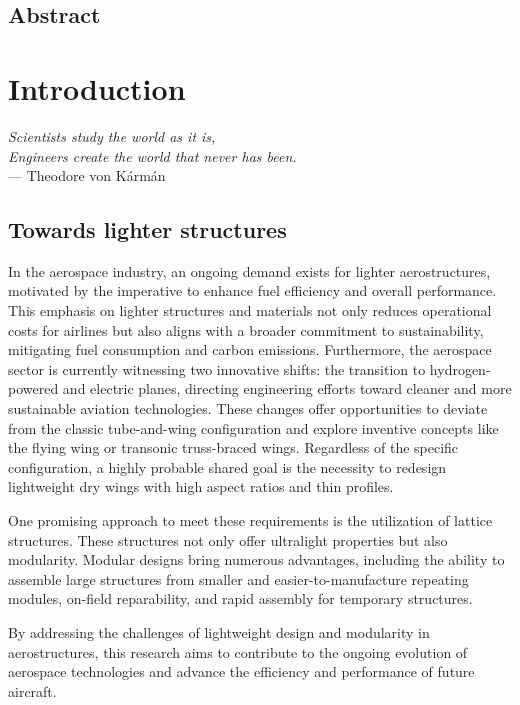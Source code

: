 \section*{Abstract}

\chapter*{Introduction}

\textit{Scientists study the world as it is,}\\
\textit{Engineers create the world that never has been.} \vspace{5pt} \\
--- Theodore von K\'arm\'an \\

\section*{Towards lighter structures}

In the aerospace industry, an ongoing demand exists for lighter aerostructures, motivated by the imperative to enhance fuel efficiency and overall performance. This emphasis on lighter structures and materials not only reduces operational costs for airlines but also aligns with a broader commitment to sustainability, mitigating fuel consumption and carbon emissions. Furthermore, the aerospace sector is currently witnessing two innovative shifts: the transition to hydrogen-powered and electric planes, directing engineering efforts toward cleaner and more sustainable aviation technologies. These changes offer opportunities to deviate from the classic tube-and-wing configuration and explore inventive concepts like the flying wing or transonic truss-braced wings. Regardless of the specific configuration, a highly probable shared goal is the necessity to redesign lightweight dry wings with high aspect ratios and thin profiles.

One promising approach to meet these requirements is the utilization of lattice structures. These structures not only offer ultralight properties but also modularity. Modular designs bring numerous advantages, including the ability to assemble large structures from smaller and easier-to-manufacture repeating modules, on-field reparability, and rapid assembly for temporary structures.



By addressing the challenges of lightweight design and modularity in aerostructures, this research aims to contribute to the ongoing evolution of aerospace technologies and advance the efficiency and performance of future aircraft.


